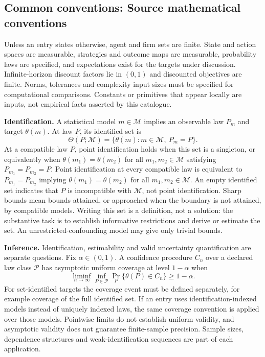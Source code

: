 \documentclass[11pt,a4paper]{article}
\begin{document}
\subsection*{Common conventions: Source mathematical conventions}

Unless an entry states otherwise, agent and firm sets are finite. State and action spaces are measurable, strategies and outcome maps are measurable, probability laws are specified, and expectations exist for the targets under discussion. Infinite-horizon discount factors lie in $(0,1)$ and discounted objectives are finite. Norms, tolerances and complexity input sizes must be specified for computational comparisons. Constants or primitives that appear locally are inputs, not empirical facts asserted by this catalogue.

\textbf{Identification.} A statistical model $m\in\mathcal M$ implies an observable law $P_m$ and target $\theta(m)$. At law $P$, its identified set is
\[
\Theta(P;\mathcal M)=\{\theta(m):m\in\mathcal M,\ P_m=P\}.
\]
At a compatible law $P$, point identification holds when this set is a singleton, or equivalently when $\theta(m_1)=\theta(m_2)$ for all $m_1,m_2\in\mathcal M$ satisfying $P_{m_1}=P_{m_2}=P$. Point identification at every compatible law is equivalent to $P_{m_1}=P_{m_2}$ implying $\theta(m_1)=\theta(m_2)$ for all $m_1,m_2\in\mathcal M$. An empty identified set indicates that $P$ is incompatible with $\mathcal M$, not point identification. Sharp bounds mean bounds attained, or approached when the boundary is not attained, by compatible models. Writing this set is a definition, not a solution: the substantive task is to establish informative restrictions and derive or estimate the set. An unrestricted-confounding model may give only trivial bounds.

\textbf{Inference.} Identification, estimability and valid uncertainty quantification are separate questions. Fix $\alpha\in(0,1)$. A confidence procedure $C_n$ over a declared law class $\mathcal P$ has asymptotic uniform coverage at level $1-\alpha$ when
\[
\liminf_{n\to\infty}\inf_{P\in\mathcal P}\Pr_P\{\theta(P)\in C_n\}\geq1-\alpha.
\]
For set-identified targets the coverage event must be defined separately, for example coverage of the full identified set. If an entry uses identification-indexed models instead of uniquely indexed laws, the same coverage convention is applied over those models. Pointwise limits do not establish uniform validity, and asymptotic validity does not guarantee finite-sample precision. Sample sizes, dependence structures and weak-identification sequences are part of each application.
\end{document}
